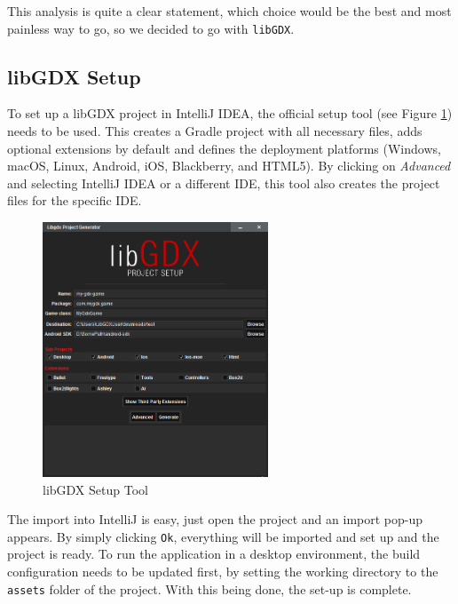 \documentclass[12p]{article}
\begin{document}
This analysis is quite a clear statement, which choice would be the best and most painless way to go, so we decided to go with \texttt{libGDX}.


\subsection{libGDX Setup} \label{DocSetup}

To set up a libGDX project in IntelliJ IDEA, the official setup tool (see Figure \ref{fig:LibGDXSetupScreenshot}) needs to be used. This creates a Gradle project with all necessary files, adds optional extensions by default and defines the deployment platforms (Windows, macOS, Linux, Android, iOS, Blackberry, and HTML5). By clicking on \emph{Advanced} and selecting IntelliJ IDEA or a different IDE, this tool also creates the project files for the specific IDE.

\begin{figure}[ht]
  \centering
  \includegraphics[width=0.6\textwidth]{libGDX_setup.png}
  \caption{libGDX Setup Tool}
  \label{fig:LibGDXSetupScreenshot}
\end{figure}

The import into IntelliJ is easy, just open the project and an import pop-up appears. By simply clicking \texttt{Ok}, everything will be imported and set up and the project is ready. To run the application in a desktop environment, the build configuration needs to be updated first, by setting the working directory to the \texttt{assets} folder of the project. With this being done, the set-up is complete.
\end{document}
